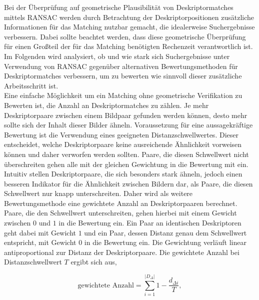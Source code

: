 Bei der Überprüfung auf geometrische Plausibilität von Deskriptormatches mittels RANSAC werden durch Betrachtung der Deskriptorpositionen zusätzliche Informationen für das Matching nutzbar gemacht, die idealerweise Suchergebnisse verbessern. Dabei sollte beachtet werden, dass diese geometrische Überprüfung für einen Großteil der für das Matching benötigten Rechenzeit verantwortlich ist. Im Folgenden wird analysiert, ob und wie stark sich Suchergebnisse unter Verwendung von RANSAC gegenüber alternativen Bewertungsmethoden für Deskriptormatches verbessern, um zu bewerten wie sinnvoll dieser zusätzliche Arbeitsschritt ist.
\\
Eine einfache Möglichkeit um ein Matching ohne geometrische Verifikation zu Bewerten ist, die Anzahl an Deskriptormatches zu zählen. Je mehr Deskriptorpaare zwischen einem Bildpaar gefunden werden können, desto mehr sollte sich der Inhalt dieser Bilder ähneln. Voraussetzung für eine aussagekräftige Bewertung ist die Verwendung eines geeigneten Distanzschwellwertes. Dieser entscheidet, welche Deskriptorpaare keine ausreichende Ähnlichkeit vorweisen können und daher verworfen werden sollten. Paare, die diesen Schwellwert nicht überschreiten gehen alle mit der gleichen Gewichtung in die Bewertung mit ein. 
\\
Intuitiv stellen Deskriptorpaare, die sich besonders stark ähneln, jedoch einen besseren Indikator für die Ähnlichkeit zwischen Bildern dar, als Paare, die diesen Schwellwert nur knapp unterschreiten. Daher wird als weitere Bewertungsmethode eine gewichtete Anzahl an Deskriptorpaaren berechnet. Paare, die den Schwellwert unterschreiten, gehen hierbei mit einem Gewicht zwischen $0$ und $1$ in die Bewertung ein. Ein Paar an identischen Deskriptoren geht dabei mit Gewicht $1$ und ein Paar, dessen Distanz genau dem Schwellwert entspricht, mit Gewicht $0$ in die Bewertung ein. Die Gewichtung verläuft linear antiproportional zur Distanz der Deskriptorpaare. Die gewichtete Anzahl bei Distanzschwellwert $T$ ergibt sich aus,

\begin{equation}
\text{gewichtete Anzahl} = \sum_{i=1}^{|D_\Delta|}{1 - \frac{d_{\Delta i}}{T}},
\end{equation}

